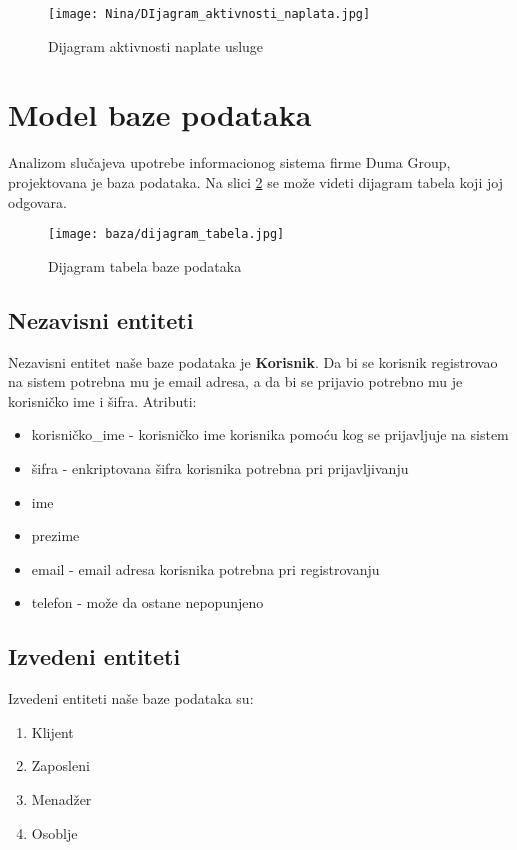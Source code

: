 \documentclass[a4paper]{article}
\begin{document}
\begin{figure}[H]
    \centering
    \texttt{[image: Nina/DIjagram\_aktivnosti\_naplata.jpg]}
    \caption{Dijagram aktivnosti naplate usluge}
    \label{fig:RegistracijaZ}
\end{figure}

\section{Model baze podataka}

Analizom slučajeva upotrebe informacionog sistema firme Duma Group, projektovana je baza podataka. Na slici \ref{fig:dijagramTabela}  se može videti dijagram tabela koji joj odgovara.

\begin{figure}[H]
    \centering
    \texttt{[image: baza/dijagram\_tabela.jpg]}
    \caption{Dijagram tabela baze podataka}
    \label{fig:dijagramTabela}
\end{figure}

\subsection{Nezavisni entiteti}

Nezavisni entitet naše baze podataka je \textbf{Korisnik}. Da bi se korisnik registrovao na sistem potrebna mu je email adresa, a da bi se prijavio potrebno mu je korisničko ime i šifra. Atributi:
\begin{itemize}
    \item korisničko\_ime - korisničko ime korisnika pomoću kog se prijavljuje na sistem
    \item šifra - enkriptovana šifra korisnika potrebna pri prijavljivanju
    \item ime
    \item prezime
    \item email - email adresa korisnika potrebna pri registrovanju
    \item telefon - može da ostane nepopunjeno
\end{itemize}


\subsection{Izvedeni entiteti}

Izvedeni entiteti naše baze podataka su:
\begin{enumerate}
    \item Klijent
    \item Zaposleni
    \item Menadžer
    \item Osoblje
\end{enumerate}
\end{document}
